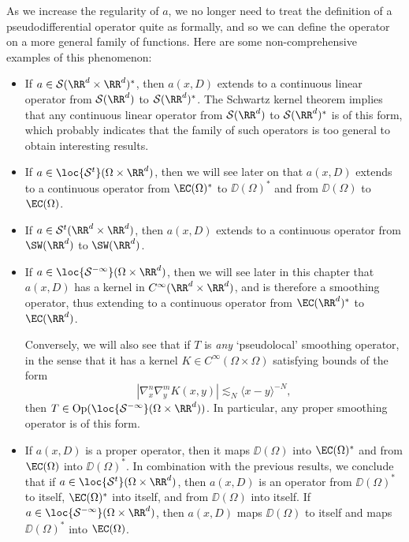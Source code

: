 As we increase the regularity of $a$, we no longer need to treat the definition of a pseudodifferential operator quite as formally, and so we can define the operator on a more general family of functions. Here are some non-comprehensive examples of this phenomenon:
%
\begin{itemize}
    \item If $a \in \mathcal{S}(\RR^d \times \RR^d)^*$, then $a(x,D)$ extends to a continuous linear operator from $\mathcal{S}(\RR^d)$ to $\mathcal{S}(\RR^d)^*$. The Schwartz kernel theorem implies that any continuous linear operator from $\mathcal{S}(\RR^d)$ to $\mathcal{S}(\RR^d)^*$ is of this form, which probably indicates that the family of such operators is too general to obtain interesting results.

    \item If $a \in \loc{\mathcal{S}^t}(\Omega \times \RR^d)$, then we will see later on that $a(x,D)$ extends to a continuous operator from $\EC(\Omega)^*$ to $\DD(\Omega)^*$ and from $\DD(\Omega)$ to $\EC(\Omega)$.

    \item If $a \in \mathcal{S}^t(\RR^d \times \RR^d)$, then $a(x,D)$ extends to a continuous operator from $\SW(\RR^d)$ to $\SW(\RR^d)$.

    \item If $a \in \loc{\mathcal{S}^{-\infty}}(\Omega \times \RR^d)$, then we will see later in this chapter that $a(x,D)$ has a kernel in $C^\infty(\RR^d \times \RR^d)$, and is therefore a smoothing operator, thus extending to a continuous operator from $\EC(\RR^d)^*$ to $\EC(\RR^d)$.

    Conversely, we will also see that if $T$ is \emph{any} `pseudolocal' smoothing operator, in the sense that it has a kernel $K \in C^\infty(\Omega \times \Omega)$ satisfying bounds of the form
    \[ |\nabla^n_x \nabla^m_y K(x,y)| \lesssim_N \langle x - y \rangle^{-N}, \]
    then $T \in \text{Op}(\loc{\mathcal{S}^{-\infty}}(\Omega \times \RR^d))$. In particular, any proper smoothing operator is of this form.

    \item If $a(x,D)$ is a proper operator, then it maps $\DD(\Omega)$ into $\EC(\Omega)^*$ and from $\EC(\Omega)$ into $\DD(\Omega)^*$. In combination with the previous results, we conclude that if $a \in \loc{\mathcal{S}^t}(\Omega \times \RR^d)$, then $a(x,D)$ is an operator from $\DD(\Omega)^*$ to itself, $\EC(\Omega)^*$ into itself, and from $\DD(\Omega)$ into itself. If $a \in \loc{\mathcal{S}^{-\infty}}(\Omega \times \RR^d)$, then $a(x,D)$ maps $\DD(\Omega)$ to itself and maps $\DD(\Omega)^*$ into $\EC(\Omega)$.


\end{itemize}
